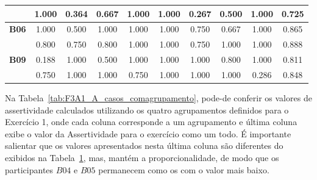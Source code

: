 \begin{table}[htbp]
\begin{tabular}{|cccccccccc|}
		\rowcolor[HTML]{F2F2F2} 
		\multicolumn{1}{|c|}{\cellcolor[HTML]{F2F2F2}\textbf{B05}} & \multicolumn{1}{c|}{\cellcolor[HTML]{F2F2F2}1.000} & \multicolumn{1}{c|}{\cellcolor[HTML]{F2F2F2}0.364} & \multicolumn{1}{c|}{\cellcolor[HTML]{F2F2F2}0.667} & \multicolumn{1}{c|}{\cellcolor[HTML]{F2F2F2}1.000} & \multicolumn{1}{c|}{\cellcolor[HTML]{F2F2F2}1.000} & \multicolumn{1}{c|}{\cellcolor[HTML]{F2F2F2}0.267} & \multicolumn{1}{c|}{\cellcolor[HTML]{F2F2F2}0.500} & \multicolumn{1}{c|}{\cellcolor[HTML]{F2F2F2}1.000} & 0.725 \\ \hline
		\multicolumn{1}{|c|}{\textbf{B06}} & \multicolumn{1}{c|}{1.000} & \multicolumn{1}{c|}{0.500} & \multicolumn{1}{c|}{1.000} & \multicolumn{1}{c|}{1.000} & \multicolumn{1}{c|}{1.000} & \multicolumn{1}{c|}{0.750} & \multicolumn{1}{c|}{0.667} & \multicolumn{1}{c|}{1.000} & 0.865 \\ \hline
		\rowcolor[HTML]{F2F2F2} 
		\multicolumn{1}{|c|}{\cellcolor[HTML]{F2F2F2}\textbf{B08}} & \multicolumn{1}{c|}{\cellcolor[HTML]{F2F2F2}0.800} & \multicolumn{1}{c|}{\cellcolor[HTML]{F2F2F2}0.750} & \multicolumn{1}{c|}{\cellcolor[HTML]{F2F2F2}0.800} & \multicolumn{1}{c|}{\cellcolor[HTML]{F2F2F2}1.000} & \multicolumn{1}{c|}{\cellcolor[HTML]{F2F2F2}1.000} & \multicolumn{1}{c|}{\cellcolor[HTML]{F2F2F2}0.750} & \multicolumn{1}{c|}{\cellcolor[HTML]{F2F2F2}1.000} & \multicolumn{1}{c|}{\cellcolor[HTML]{F2F2F2}1.000} & 0.888 \\ \hline
		\multicolumn{1}{|c|}{\textbf{B09}} & \multicolumn{1}{c|}{0.188} & \multicolumn{1}{c|}{1.000} & \multicolumn{1}{c|}{0.500} & \multicolumn{1}{c|}{1.000} & \multicolumn{1}{c|}{1.000} & \multicolumn{1}{c|}{1.000} & \multicolumn{1}{c|}{0.800} & \multicolumn{1}{c|}{1.000} & 0.811 \\ \hline
		\rowcolor[HTML]{F2F2F2} 
		\multicolumn{1}{|c|}{\cellcolor[HTML]{F2F2F2}\textbf{B10}} & \multicolumn{1}{c|}{\cellcolor[HTML]{F2F2F2}0.750} & \multicolumn{1}{c|}{\cellcolor[HTML]{F2F2F2}1.000} & \multicolumn{1}{c|}{\cellcolor[HTML]{F2F2F2}1.000} & \multicolumn{1}{c|}{\cellcolor[HTML]{F2F2F2}0.750} & \multicolumn{1}{c|}{\cellcolor[HTML]{F2F2F2}1.000} & \multicolumn{1}{c|}{\cellcolor[HTML]{F2F2F2}1.000} & \multicolumn{1}{c|}{\cellcolor[HTML]{F2F2F2}1.000} & \multicolumn{1}{c|}{\cellcolor[HTML]{F2F2F2}0.286} & 0.848 \\ \hline
	\end{tabular}
	\label{tab:F3A1_A_casos_semagrupamento}
\end{table}

Na Tabela~\ref{tab:F3A1_A_casos_comagrupamento}, pode-de conferir os valores de assertividade calculados utilizando os quatro agrupamentos definidos para o Exercício 1, onde cada coluna corresponde a um agrupamento e última coluna exibe o valor da Assertividade para o exercício como um todo. É importante salientar que os valores apresentados nesta última coluna são diferentes do exibidos na Tabela~\ref{tab:F3A1_A_casos_semagrupamento}, mas, mantém a proporcionalidade, de modo que os participantes $B04$ e $B05$ permanecem como os com o valor mais baixo.

